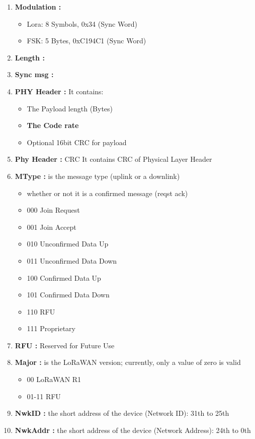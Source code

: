 \begin{landscape}
\scriptsize
\begin{multicols}{2}
\begin{enumerate}
	\item \textbf{Modulation :}
	\begin{itemize}
		\item Lora:  8 Symbols, 0x34 (Sync Word)
		\item FSK:  5 Bytes, 0xC194C1 (Sync Word)
	\end{itemize}
	\item \textbf{Length :}
	\item \textbf{Sync msg :}
	\item \textbf{PHY Header :}  It contains:
	\begin{itemize}
		\item The Payload length (Bytes)
		\item \textbf{The Code rate}
		\item Optional 16bit CRC for payload 
	\end{itemize}
	\item \textbf{Phy Header :} CRC  It contains CRC of Physical Layer Header
	\item \textbf{MType :}  is the message type (uplink or a downlink)
	\begin{itemize}
		\item whether or not it is a confirmed message (reqst ack)
		\item 000 	Join Request
		\item 001 	Join Accept
		\item 010 	Unconfirmed Data Up
		\item 011 	Unconfirmed Data Down
		\item 100 	Confirmed Data Up
		\item 101 	Confirmed Data Down
		\item 110 	RFU
		\item 111 	Proprietary
	\end{itemize}
	\item \textbf{RFU :} Reserved for Future Use
	\item \textbf{Major :}  is the LoRaWAN version; currently, only a value of zero is valid
	\begin{itemize}
		\item 00 	LoRaWAN R1
		\item 01-11 	RFU
	\end{itemize}
	\item \textbf{NwkID :} the short address of the device (Network ID): 31th to 25th
	\item \textbf{NwkAddr :} the short address of the device (Network Address): 24th to 0th

\end{enumerate}
\end{multicols}
\end{landscape}
